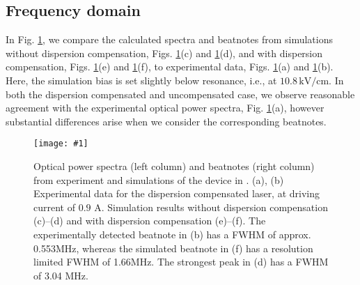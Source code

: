 \documentclass[10pt]{article}
\newcommand{\includegraphicsXL}[1]{\texttt{[image: \#1]}}
\begin{document}
	\subsection{Frequency domain}
	\label{sec:frequency-domain}
	
	In Fig. \ref{fig:img05}, we compare the calculated spectra and beatnotes from
	simulations without dispersion compensation, Figs. \ref{fig:img05}(c) and \ref{fig:img05}(d), and with
	dispersion compensation, Figs. \ref{fig:img05}(e) and \ref{fig:img05}(f), to experimental data, Figs.
	\ref{fig:img05}(a) and \ref{fig:img05}(b). Here, the simulation bias is set slightly below
	resonance, i.e., at $10.8{\,}\mathrm{kV}/\mathrm{cm}$. In both the dispersion
	compensated and uncompensated case, we observe reasonable agreement
	with the experimental optical power spectra, Fig. \ref{fig:img05}(a), however
	substantial differences arise when we consider the corresponding
	beatnotes.
	\begin{figure}[h!]
		\begin{center}
			\includegraphicsXL{SPECTRA_EXPERIMENT.eps}
		\end{center}
		\caption{ Optical power spectra (left column) and beatnotes (right column)
			from experiment and simulations of the device in \cite{burghoff2014terahertz}.
			(a), (b) Experimental data for the dispersion compensated laser,
			at driving current of $0.9$ A. Simulation results without dispersion
			compensation (c)--(d) and with dispersion compensation
			(e)--(f). The experimentally detected beatnote in
			(b) has a FWHM of approx. 0.553MHz, whereas the simulated beatnote in
			(f) has a resolution limited FWHM of 1.66MHz. The strongest peak in (d)
			has a FWHM of 3.04 MHz.}%
		\label{fig:img05}%
	\end{figure}
	
\end{document}
